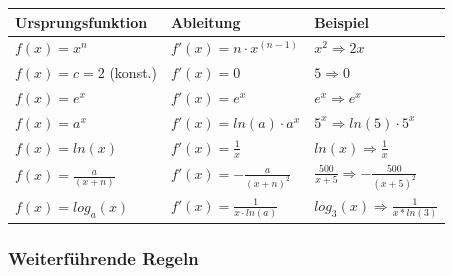 \documentclass[12pt]{scrartcl}
\begin{document}
\renewcommand{\arraystretch}{1.5}
\begin{center}
    \begin{tabular}{ | m{10em} | m{10em} | m{10em} | }
        \hline
        Ursprungsfunktion & Ableitung & Beispiel \\ 
        \hline
        $f(x) = x^n$ & $f'(x) = n \cdot x^{(n-1)} $ & $x^2 \Rightarrow 2x$\\ 
        \hline
        $f(x) = c = 2$ (konst.) & $f'(x) = 0$ & $5 \Rightarrow 0$ \\
        \hline
        $f(x) = e^x$ & $f'(x) = e^x$ & $e^x \Rightarrow e^x$ \\
        \hline
        $f(x) = a^x$ & $f'(x) = ln(a) \cdot a^x$ & $5^x \Rightarrow ln(5) \cdot 5^x$ \\
        \hline
        $f(x) = ln(x)$ & $f'(x) = \frac{1}{x}$ & $ln(x) \Rightarrow \frac{1}{x}$ \\
        \hline 
        $f(x) = \frac{a}{(x + n)} $ & $ f'(x) = -\frac{a}{(x+n)^2} $ & $\frac{500}{x + 5} \Rightarrow -\frac{500}{(x+5)^2}$\\
        \hline 
        $f(x) = log_a(x) $ & $f'(x) = \frac{1}{x \cdot ln(a)}$ & $log_3(x) \Rightarrow \frac{1}{x * ln(3)}$ \\
        \hline 

    \end{tabular}
\end{center}

\newpage

\subsubsection{Weiterführende Regeln}
\end{document}
